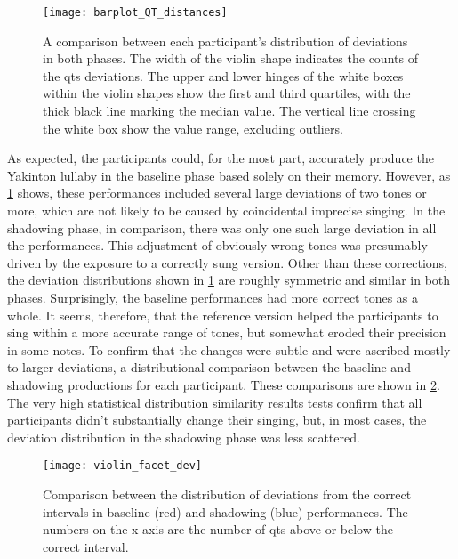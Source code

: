 \begin{figure}[t!]
	\centering
	\texttt{[image: barplot\_QT\_distances]}
	\caption[Comparison of participants' singing deviations distributions]
		{A comparison between each participant's distribution of deviations in both phases.
		 The width of the violin shape indicates the counts of the \acsp{qt} deviations.
		 The upper and lower hinges of the white boxes within the violin shapes show the first and third quartiles, with the thick black line marking the median value.
		 The vertical line crossing the white box show the value range, excluding outliers.}
	\label{fig:barplot_QT_distances}
\end{figure}
%
As expected, the participants could, for the most part, accurately produce the Yakinton lullaby in the baseline phase based solely on their memory.
However, as \cref{fig:barplot_QT_distances} shows, these performances included several large deviations of two tones or more, which are not likely to be caused by coincidental imprecise singing.
In the shadowing phase, in comparison, there was only one such large deviation in all the performances.
This adjustment of obviously wrong tones was presumably driven by the exposure to a correctly sung version.
Other than these corrections, the deviation distributions shown in \cref{fig:barplot_QT_distances} are roughly symmetric and similar in both phases.
Surprisingly, the baseline performances had more correct tones as a whole.
It seems, therefore, that the reference version helped the participants to sing within a more accurate range of tones, but somewhat eroded their precision in some notes.
To confirm that the changes were subtle and were ascribed mostly to larger deviations, a distributional comparison between the baseline and shadowing productions for each participant.
These comparisons are shown in \cref{fig:violin_facet_dev}.
The very high statistical distribution similarity results tests confirm that all participants didn't substantially change their singing, but, in most cases, the deviation distribution in the shadowing phase was less scattered.
%
\begin{figure}[t!]
	\centering
	\texttt{[image: violin\_facet\_dev]}
	\caption[Summary of within-participant interval deviation distribution]
		{Comparison between the distribution of deviations from the correct intervals in baseline (red) and shadowing (blue) performances.
		The numbers on the x-axis are the number of \acp{qt} above or below the correct interval.}
	\label{fig:violin_facet_dev}
\end{figure}
